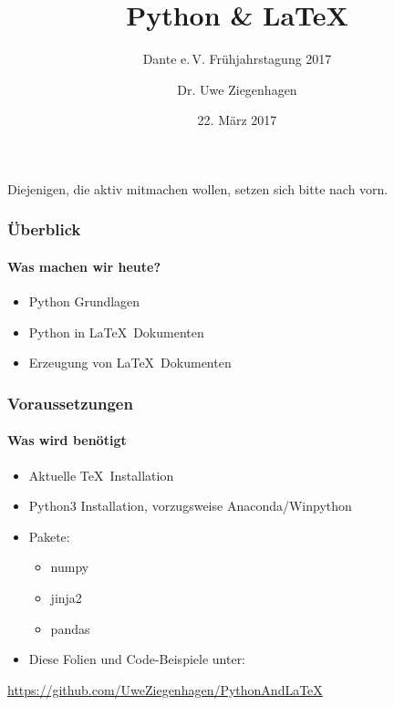 \documentclass[12pt,ngerman]{beamer}
\author{Dr. Uwe Ziegenhagen}
\title{Python \& \LaTeX}
\subtitle{Dante e.\,V. Frühjahrstagung 2017}
\date{22. März 2017}
\begin{document}
\begin{frame}

{\large Diejenigen, die aktiv mitmachen wollen, setzen sich bitte nach vorn.}

\end{frame}

\begin{frame}

\maketitle

\end{frame}


\begin{frame}
\frametitle{Überblick}
\framesubtitle{Was machen wir heute?}

\begin{itemize}
\item Python Grundlagen
\item Python in \LaTeX\ Dokumenten
\item Erzeugung von \LaTeX\ Dokumenten
\end{itemize}
\end{frame}


\begin{frame}
\frametitle{Voraussetzungen}
\framesubtitle{Was wird benötigt}

\begin{itemize}
\item Aktuelle \TeX\ Installation
\item Python3 Installation, vorzugsweise Anaconda/Winpython
\item Pakete:
\begin{itemize}
	\item numpy
	\item jinja2
	\item pandas
\end{itemize}
\item Diese Folien und Code-Beispiele unter: 
\end{itemize}

\url{https://github.com/UweZiegenhagen/PythonAndLaTeX}

\end{frame}
\end{document}
